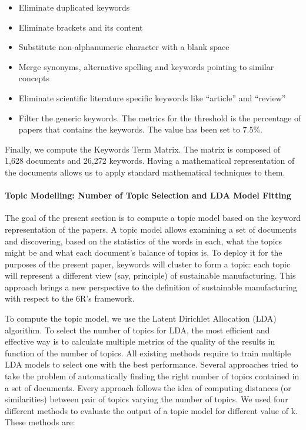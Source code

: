 \documentclass[]{book}
\providecommand{\tightlist}{%
  \setlength{\itemsep}{0pt}\setlength{\parskip}{0pt}}
\let\oldparagraph\paragraph
\renewcommand{\paragraph}[1]{\oldparagraph{#1}\mbox{}}
\begin{document}
\begin{itemize}
\tightlist
\item
  Eliminate duplicated keywords
\item
  Eliminate brackets and its content
\item
  Substitute non-alphanumeric character with a blank space
\item
  Merge synonyms, alternative spelling and keywords pointing to similar
  concepts
\item
  Eliminate scientific literature specific keywords like ``article'' and
  ``review''
\item
  Filter the generic keywords. The metrics for the threshold is the
  percentage of papers that contains the keywords. The value has been
  set to 7.5\%.
\end{itemize}

Finally, we compute the Keywords Term Matrix. The matrix is composed of
1,628 documents and 26,272 keywords. Having a mathematical
representation of the documents allows us to apply standard mathematical
techniques to them.

\paragraph{Topic Modelling: Number of Topic Selection and LDA Model
Fitting}\label{topic-modelling-number-of-topic-selection-and-lda-model-fitting}

The goal of the present section is to compute a topic model based on the
keyword representation of the papers. A topic model allows examining a
set of documents and discovering, based on the statistics of the words
in each, what the topics might be and what each document's balance of
topics is. To deploy it for the purposes of the present paper, keywords
will cluster to form a topic: each topic will represent a different view
(say, principle) of sustainable manufacturing. This approach brings a
new perspective to the definition of sustainable manufacturing with
respect to the 6R's framework.

To compute the topic model, we use the Latent Dirichlet Allocation (LDA)
algorithm. To select the number of topics for LDA, the most efficient
and effective way is to calculate multiple metrics of the quality of the
results in function of the number of topics. All existing methods
require to train multiple LDA models to select one with the best
performance. Several approaches tried to take the problem of
automatically finding the right number of topics contained in a set of
documents. Every approach follows the idea of computing distances (or
similarities) between pair of topics varying the number of topics. We
used four different methods to evaluate the output of a topic model for
different value of k. These methods are:
\end{document}
